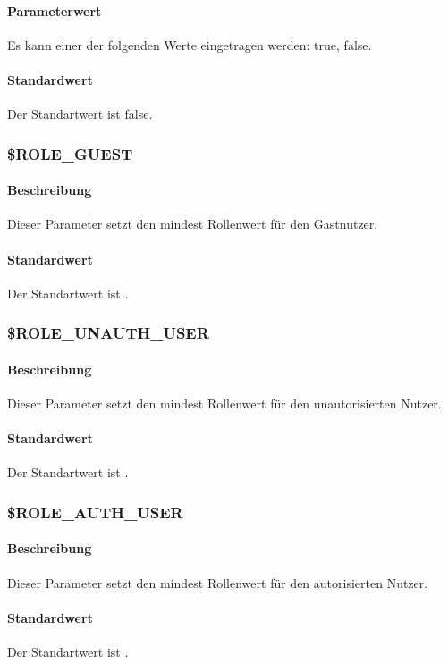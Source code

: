 \paragraph{Parameterwert}Es kann einer der folgenden Werte eingetragen werden: {\glqq true\grqq}, {\glqq false\grqq}.
\paragraph{Standardwert}Der Standartwert ist {\glqq false\grqq}.

\subsubsection{\$ROLE\_GUEST}
\paragraph{Beschreibung}Dieser Parameter setzt den mindest Rollenwert für den Gastnutzer.
\paragraph{Standardwert}Der Standartwert ist {\grqq}.

\subsubsection{\$ROLE\_UNAUTH\_USER}
\paragraph{Beschreibung}Dieser Parameter setzt den mindest Rollenwert für den unautorisierten Nutzer.
\paragraph{Standardwert}Der Standartwert ist {\grqq}.

\subsubsection{\$ROLE\_AUTH\_USER}
\paragraph{Beschreibung}Dieser Parameter setzt den mindest Rollenwert für den autorisierten Nutzer.
\paragraph{Standardwert}Der Standartwert ist {\grqq}.

